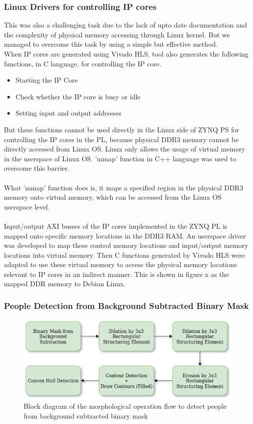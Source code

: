 \documentclass[12pt,a4paper]{report}
\begin{document}
\subsubsection{Linux Drivers for controlling IP cores}
This was also a challenging task due to the lack of upto date documentation and the complexity of physical memory accessing through Linux kernel. But we managed to overcome this task by using a simple but effective method.\\
When IP cores are generated using Vivado HLS, tool also generates the  following functions, in C language, for controlling the IP core.
\begin{itemize}
\item Starting the IP Core
\item Check whether the IP core is busy or idle
\item Setting input and output addresses
\end{itemize}
But these functions cannot be used directly in the Linux side of ZYNQ PS for controlling the IP cores in the PL, because physical DDR3 memory cannot be directly accessed from Linux OS. Linux only allows the usage of virtual memory in the userspace of Linux OS. 'mmap' function in C++ language was used to overcome this barrier.\\\\
What 'mmap' function does is, it maps a specified region in the physical DDR3 memory onto virtual memory, which can be accessed from the Linux OS userspace level. \\\\
Input/output AXI busses of the IP cores implemented in the ZYNQ PL is mapped onto specific memory locations in the DDR3 RAM. An userspace driver was developed to map these control memory locations and input/output memory locations into virtual memory. Then C functions generated by Vivado HLS were adapted to use these virtual memory to access the physical memory locations relevant to IP cores in an indirect manner. This is shown in figure x as the mapped DDR memory to Debian Linux.
\subsubsection{People Detection from Background Subtracted Binary Mask}

\begin{figure}[H]
\includegraphics[width=13cm]{morphology.png}
\centering
\caption{Block diagram of the morphological operation flow to detect people from background subtracted binary mask}
\label{morphology}
\end{figure}
\end{document}
